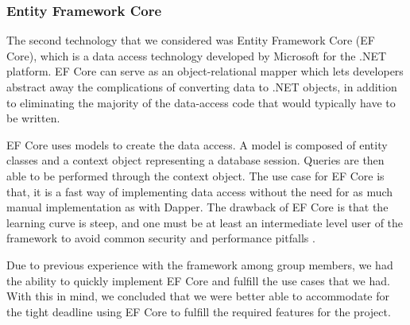 \subsubsection{Entity Framework Core}
The second technology that we considered was Entity Framework Core (EF Core), which is a data access technology developed by Microsoft for the .NET platform. EF Core can serve as an object-relational mapper \cite{Object_relational_mapping} which lets developers abstract away the complications of converting data to .NET objects, in addition to eliminating the majority of the data-access code that would typically have to be written.

EF Core uses models to create the data access. A model is composed of entity classes and a context object representing a database session.
Queries are then able to be performed through the context object. 
The use case for EF Core is that, it is a fast way of implementing data access without the need for as much manual implementation as with Dapper. 
The drawback of EF Core is that the learning curve is steep, and one must be at least an intermediate level user of the framework to avoid common security and performance pitfalls \cite{EFCore}.

Due to previous experience with the framework among group members, we had the ability to quickly implement EF Core and fulfill the use cases that we had.
With this in mind, we concluded that we were better able to accommodate for the tight deadline using EF Core to fulfill the required features for the \knox{} project.